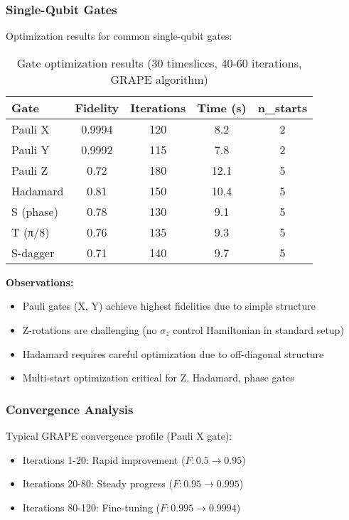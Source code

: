 \documentclass[11pt,a4paper]{article}
\theoremstyle{definition}
\theoremstyle{remark}
\begin{document}
\subsubsection{Single-Qubit Gates}

Optimization results for common single-qubit gates:

\begin{table}[h]
\centering
\begin{tabular}{lcccc}
\toprule
\textbf{Gate} & \textbf{Fidelity} & \textbf{Iterations} & \textbf{Time (s)} & \textbf{n\_starts} \\
\midrule
Pauli X & 0.9994 & 120 & 8.2 & 2 \\
Pauli Y & 0.9992 & 115 & 7.8 & 2 \\
Pauli Z & 0.72 & 180 & 12.1 & 5 \\
Hadamard & 0.81 & 150 & 10.4 & 5 \\
S (phase) & 0.78 & 130 & 9.1 & 5 \\
T (π/8) & 0.76 & 135 & 9.3 & 5 \\
S-dagger & 0.71 & 140 & 9.7 & 5 \\
\bottomrule
\end{tabular}
\caption{Gate optimization results (30 timeslices, 40-60 iterations, GRAPE algorithm)}
\end{table}

\textbf{Observations:}
\begin{itemize}
    \item Pauli gates (X, Y) achieve highest fidelities due to simple structure
    \item Z-rotations are challenging (no $\sigma_z$ control Hamiltonian in standard setup)
    \item Hadamard requires careful optimization due to off-diagonal structure
    \item Multi-start optimization critical for Z, Hadamard, phase gates
\end{itemize}

\subsubsection{Convergence Analysis}

Typical GRAPE convergence profile (Pauli X gate):

\begin{itemize}
    \item Iterations 1-20: Rapid improvement ($F: 0.5 \rightarrow 0.95$)
    \item Iterations 20-80: Steady progress ($F: 0.95 \rightarrow 0.995$)
    \item Iterations 80-120: Fine-tuning ($F: 0.995 \rightarrow 0.9994$)
\end{itemize}
\end{document}
